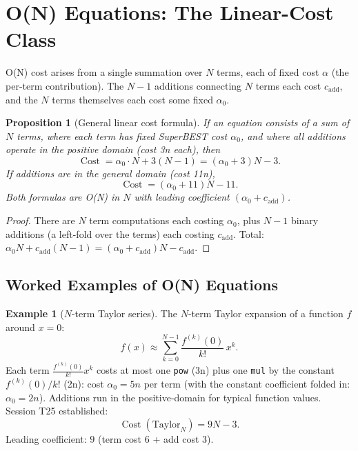 \documentclass[12pt,a4paper]{article}
\newtheorem{proposition}[theorem]{Proposition}
\theoremstyle{definition}
\newtheorem{example}[theorem]{Example}
\newcommand{\Cost}{\operatorname{Cost}}
\begin{document}
\section{O(N) Equations: The Linear-Cost Class}
\label{sec:ON}

O(N) cost arises from a single summation over $N$ terms, each of
fixed cost $\alpha$ (the per-term contribution).  The $N-1$ additions
connecting $N$ terms each cost $c_{\mathrm{add}}$, and the $N$ terms
themselves each cost some fixed $\alpha_0$.

\begin{proposition}[General linear cost formula]
\label{prop:linear_formula}
If an equation consists of a sum of $N$ terms, where each term has
fixed SuperBEST cost $\alpha_0$, and where all additions operate in
the positive domain (cost 3n each), then
\[
  \Cost = \alpha_0 \cdot N + 3(N-1) = (\alpha_0 + 3)N - 3.
\]
If additions are in the general domain (cost 11n),
\[
  \Cost = (\alpha_0 + 11)N - 11.
\]
Both formulas are O(N) in $N$ with leading coefficient $(\alpha_0 + c_{\mathrm{add}})$.
\end{proposition}

\begin{proof}
There are $N$ term computations each costing $\alpha_0$, plus $N-1$
binary additions (a left-fold over the terms) each costing
$c_{\mathrm{add}}$.  Total: $\alpha_0 N + c_{\mathrm{add}}(N-1)
= (\alpha_0 + c_{\mathrm{add}})N - c_{\mathrm{add}}$.
\end{proof}

\subsection{Worked Examples of O(N) Equations}

\begin{example}[$N$-term Taylor series]
\label{ex:taylor}
The $N$-term Taylor expansion of a function $f$ around $x=0$:
\[
  f(x) \approx \sum_{k=0}^{N-1} \frac{f^{(k)}(0)}{k!}\, x^k.
\]
Each term $\frac{f^{(k)}(0)}{k!} x^k$ costs at most one \texttt{pow}
(3n) plus one \texttt{mul} by the constant $f^{(k)}(0)/k!$ (2n): cost
$\alpha_0 = 5n$ per term (with the constant coefficient folded in:
$\alpha_0 = 2n$).  Additions run in the positive-domain for typical
function values.  Session T25 established:
\[
  \boxed{\Cost(\text{Taylor}_N) = 9N - 3.}
\]
Leading coefficient: $9$ (term cost 6 + add cost 3).
\end{example}
\end{document}
